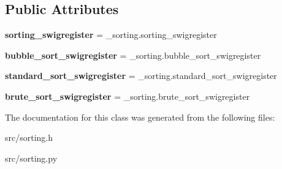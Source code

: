 \subsection*{Public Attributes}
\begin{DoxyCompactItemize}
\item 
\hypertarget{classsorting_a4cc8da423268f92f163d7d4be24467d6}{
{\bfseries sorting\_\-swigregister} = \_\-sorting.sorting\_\-swigregister}
\label{df/d42/classsorting_a4cc8da423268f92f163d7d4be24467d6}

\item 
\hypertarget{classsorting_a84093d681eb3f394fb132983eb3abd09}{
{\bfseries bubble\_\-sort\_\-swigregister} = \_\-sorting.bubble\_\-sort\_\-swigregister}
\label{df/d42/classsorting_a84093d681eb3f394fb132983eb3abd09}

\item 
\hypertarget{classsorting_aef1ecd7d8db60fe2cfef725f65970a22}{
{\bfseries standard\_\-sort\_\-swigregister} = \_\-sorting.standard\_\-sort\_\-swigregister}
\label{df/d42/classsorting_aef1ecd7d8db60fe2cfef725f65970a22}

\item 
\hypertarget{classsorting_a498a3af6e106159779f2583ed3e26fb3}{
{\bfseries brute\_\-sort\_\-swigregister} = \_\-sorting.brute\_\-sort\_\-swigregister}
\label{df/d42/classsorting_a498a3af6e106159779f2583ed3e26fb3}

\end{DoxyCompactItemize}


The documentation for this class was generated from the following files:\begin{DoxyCompactItemize}
\item 
src/sorting.h\item 
src/sorting.py\end{DoxyCompactItemize}
